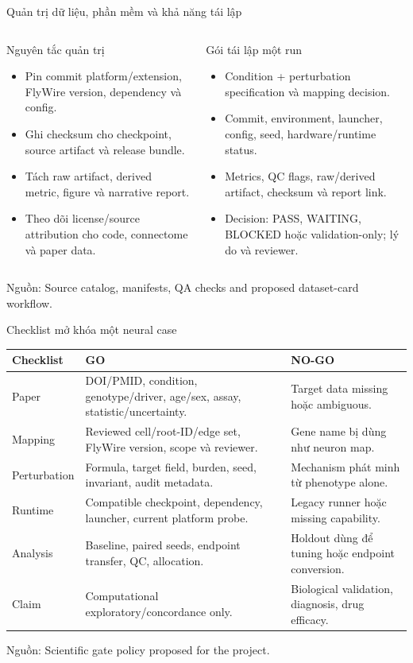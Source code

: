 \documentclass[10pt,aspectratio=169]{beamer}
\newcommand{\source}[1]{\par\vfill{\fontsize{6.0}{7}\selectfont\color{gray}Nguồn: #1\par}}
\begin{document}
\begin{frame}{Quản trị dữ liệu, phần mềm và khả năng tái lập}
\begin{columns}[T,onlytextwidth]
\begin{block}{Nguyên tắc quản trị}
\begin{itemize}\small\setlength\itemsep{4pt}
\item Pin commit platform/extension, FlyWire version, dependency và config.
\item Ghi checksum cho checkpoint, source artifact và release bundle.
\item Tách raw artifact, derived metric, figure và narrative report.
\item Theo dõi license/source attribution cho code, connectome và paper data.
\end{itemize}
\end{block}
\begin{block}{Gói tái lập một run}
\begin{itemize}\small\setlength\itemsep{4pt}
\item Condition + perturbation specification và mapping decision.
\item Commit, environment, launcher, config, seed, hardware/runtime status.
\item Metrics, QC flags, raw/derived artifact, checksum và report link.
\item Decision: PASS, WAITING, BLOCKED hoặc validation-only; lý do và reviewer.
\end{itemize}
\end{block}
\end{columns}
\source{Source catalog, manifests, QA checks and proposed dataset-card workflow.}
\end{frame}

\begin{frame}{Checklist mở khóa một neural case}
\renewcommand{\arraystretch}{1.19}\scriptsize
\begin{tabular}{@{}L{2.2cm}L{7.3cm}L{5.0cm}@{}}
\toprule
\textbf{Checklist} & \textbf{GO} & \textbf{NO-GO}\\\midrule
Paper & DOI/PMID, condition, genotype/driver, age/sex, assay, statistic/uncertainty. & Target data missing hoặc ambiguous.\\
Mapping & Reviewed cell/root-ID/edge set, FlyWire version, scope và reviewer. & Gene name bị dùng như neuron map.\\
Perturbation & Formula, target field, burden, seed, invariant, audit metadata. & Mechanism phát minh từ phenotype alone.\\
Runtime & Compatible checkpoint, dependency, launcher, current platform probe. & Legacy runner hoặc missing capability.\\
Analysis & Baseline, paired seeds, endpoint transfer, QC, allocation. & Holdout dùng để tuning hoặc endpoint conversion.\\
Claim & Computational exploratory/concordance only. & Biological validation, diagnosis, drug efficacy.\\\bottomrule
\end{tabular}
\source{Scientific gate policy proposed for the project.}
\end{frame}
\end{document}
